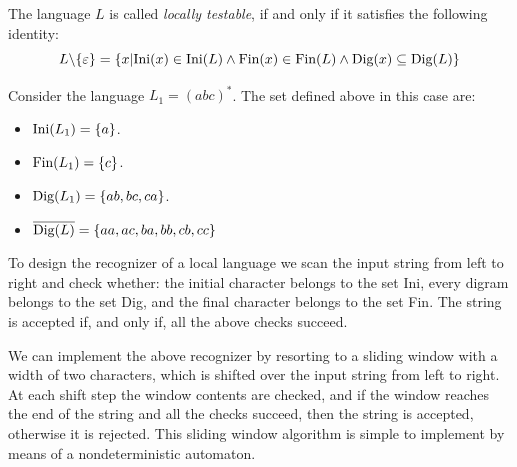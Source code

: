 \begin{definition}
    The language $L$ is called \emph{locally testable}, if and only if it satisfies the following identity: 
    \[L\backslash\{\varepsilon\}=\{x|\textnormal{Ini}(x)\in \textnormal{Ini}(L) \land \textnormal{Fin}(x)\in \textnormal{Fin}(L)\land \textnormal{Dig}(x)\subseteq \textnormal{Dig}(L)\}\]
\end{definition}
\begin{example}
    Consider the language $L_1=(abc)^{*}$. 
    The set defined above in this case are: 
    \begin{itemize}
        \item $\textnormal{Ini}(L_1)=\{a\}$.
        \item $\textnormal{Fin}(L_1)=\{c\}$.
        \item $\textnormal{Dig}(L_1)=\{ab,bc,ca\}$.
        \item $\overline{\textnormal{Dig}(L)}=\{aa,ac,ba,bb,cb,cc\}$
    \end{itemize}
\end{example}
To design the recognizer of a local language we scan the input string from left to right and check whether: the initial character belongs to the set Ini, every digram belongs to the set Dig, and the final character belongs to the set Fin. 
The string is accepted if, and only if, all the above checks succeed. 

We can implement the above recognizer by resorting to a sliding window with a width of two characters, which is shifted over the input string from left to right.
At each shift step the window contents are checked, and if the window reaches the end of the string and all the checks succeed, then the string is accepted, otherwise it is rejected. 
This sliding window algorithm is simple to implement by means of a nondeterministic automaton. 

